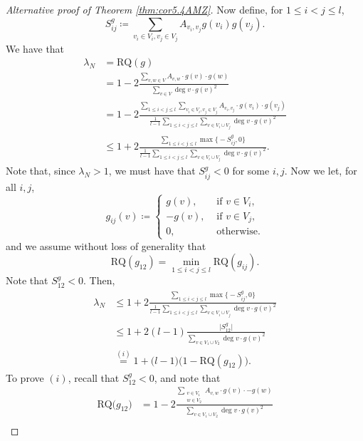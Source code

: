 \documentclass[10pt,a4paper]{amsart}
\newcommand\ddfrac[2]{\frac{\displaystyle #1}{\displaystyle #2}}
\newcommand{\RQ}{\textrm{RQ}}
\begin{document}
\begin{proof}[Alternative proof of Theorem \ref{thm:cor5.4AMZ}]
    Now define, for $1\leq i<j\leq  l$,
    \begin{equation}\label{eq:S_ij}
    S_{ij}^g\coloneqq  \sum_{v_i\in V_i, v_j\in V_j}A_{v_i,v_j}g(v_i)g(v_j).
    \end{equation}
    We have that
    \begin{align*}
        \lambda_N &= \RQ(g) \\&= 1 - 2\ddfrac{\sum_{v,w\in V}A_{v,w}\cdot g(v)\cdot g(w)}{\sum_{v\in V}\deg v\cdot g(v)^2}\\
        &= 1 - 2\ddfrac{\sum_{1\leq i<j\leq  l}\sum_{v_i\in V_i,v_j\in V_j}A_{v_i,v_j}\cdot g(v_i)\cdot g(v_j)}{\frac1{ l-1}\sum_{1\leq i< j\leq  l}\sum_{v\in V_i\cup V_j}\deg v \cdot g(v)^2}\\
        &\leq 1 + 2\ddfrac{\sum_{1\leq i<j\leq  l}\max\biggl\{-S^g_{ij},0\biggr\}}{\frac1{ l-1}\sum_{1\leq i< j\leq  l}\sum_{v\in V_i\cup V_j}\deg v \cdot g(v)^2}.
    \end{align*}
    Note that, since  $\lambda_N>1$, we must have that $S^g_{ij}< 0$ for some $i,j$. Now we let, for all $i,j$,
     \begin{equation}\label{eq:g_ij}
     g_{ij}(v)\coloneqq \begin{cases}
        g(v), &\text{ if } v\in V_i,\\
        -g(v), &\text{ if } v\in V_j,\\
        0, &\text{ otherwise.}
    \end{cases}
    \end{equation}
    and we assume without loss of generality that
    \[
    \RQ(g_{12}) = \min_{1\leq i<j\leq  l} \RQ( g_{ij}).
    \]
    Note that $S_{12}^g<0$.
    Then,
    \begin{align*}
        \lambda_N &\leq 1 + 2\ddfrac{\sum_{1\leq i<j\leq  l}\max\biggl\{-S^g_{ij},0\biggr\}}{\frac1{ l-1}\sum_{1\leq i< j\leq  l}\sum_{v\in V_i\cup V_j}\deg v \cdot g(v)^2}\\
        &\leq 1 + 2( l-1)\ddfrac{\bigl|S^g_{12}\bigr|}{\sum_{v\in V_1\cup V_2}\deg v \cdot g(v)^2}\\
        &\overset{(i)}{=} 1+\bigl( l-1\bigr)\bigl(1-\RQ(g_{12})\bigr).
    \end{align*}
    To prove $(i)$, recall that $S_{12}^g<0$, and note that
    \begin{align*}
        \RQ\bigl(g_{12}\bigr) &= 1 -2\frac{\sum_{\substack{v\in V_1\\ w\in V_2}}A_{v,w}\cdot g(v)\cdot -g(w)}{\sum_{v\in V_1\cup V_2}\deg v\cdot g(v)^2}\\

\end{align*}
\end{proof}
\end{document}
